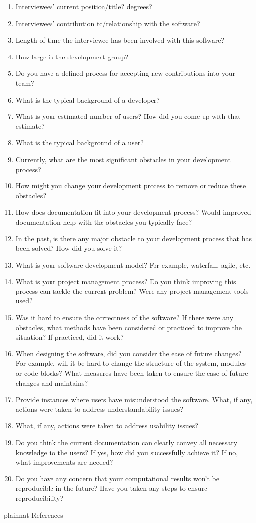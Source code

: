 \documentclass[12pt, notitlepage]{article}
\begin{document}
\begin{singlespace}
\begin{enumerate}
	\item Interviewees’ current position/title? degrees?
	\item Interviewees’ contribution to/relationship with the software?
	\item Length of time the interviewee has been involved with this software?
	\item How large is the development group?
	\item Do you have a defined process for accepting new contributions into your team?
	\item What is the typical background of a developer?
	\item What is your estimated number of users? How did you come up with that estimate?
	\item What is the typical background of a user?
	\item Currently, what are the most significant obstacles in your development process?
	\item How might you change your development process to remove or reduce these obstacles?
	\item How does documentation fit into your development process? Would improved documentation help with the obstacles you typically face?
	\item In the past, is there any major obstacle to your development process that has been solved? How did you solve it?
	\item What is your software development model? For example, waterfall, agile, etc.
	\item What is your project management process? Do you think improving this process can
tackle the current problem? Were any project management tools used?
	\item Was it hard to ensure the correctness of the software? If there were any obstacles, what methods have been considered or practiced to improve the situation? If practiced, did it work?
	\item When designing the software, did you consider the ease of future changes? For example, will it be hard to change the structure of the system, modules or code blocks? What measures have been taken to ensure the ease of future changes and maintains?
	\item Provide instances where users have misunderstood the software. What, if any, actions were taken to address understandability issues?
	\item What, if any, actions were taken to address usability issues?
	\item Do you think the current documentation can clearly convey all necessary knowledge to the users? If yes, how did you successfully achieve it? If no, what improvements are needed?
	\item Do you have any concern that your computational results won’t be reproducible in the future? Have you taken any steps to ensure reproducibility? 

\end{enumerate}

\newpage

 {plainnat}
 {References}

\end{singlespace}
\end{document}
